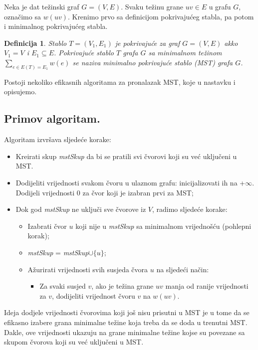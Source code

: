 \documentclass[a4paper, utf8, 11pt, colorlinks]{book}
\newtheorem{definition}{Definicija}
\begin{document}
Neka je dat težinski graf $G=(V,E)$. Svaku težinu grane $uv \in E $ u grafu $G$, označimo sa $w(uv)$. 
Krenimo prvo sa definicijom pokrivajućeg stabla, pa potom i minimalnog pokrivajućeg stabla. 
\begin{definition}
  Stablo $T =(V_1, E_1)$ je pokrivajuće za graf $G=(V,E)$ akko
  $V_1 = V$ i $E_1 \subseteq E$. Pokrivajuće stablo $T$ grafa $G$ sa minimalnom težinom 
  $\sum_{e \in E(T)=E_1} w(e)$ se naziva minimalno pokrivajuće stablo (MST) grafa $G$. 
\end{definition}
Postoji nekoliko efikasnih algoritama za pronalazak MST, koje u nastavku i opisujemo. 


\subsection{Primov algoritam.}

Algoritam izvršava sljedeće korake:

\begin{itemize}
	\item Kreirati skup \emph{mstSkup} da bi se pratili svi čvorovi koji su već uključeni u MST.
	\item Dodijeliti vrijednosti svakom čvoru u ulaznom grafu: inicijalizovati ih na +$\infty$. 
	      Dodijeli vrijednosti 0 za čvor koji je izabran prvi za MST;
	\item Dok god \emph{mstSkup} ne uključi sve čvorove iz $V$, radimo sljedeće korake:
	\begin{itemize}
		\item Izabrati čvor $u$ koji nije u \emph{mstSkup} sa minimalnom vrijednošću (pohlepni korak);
		\item \emph{mstSkup} = \emph{mstSkup}$\cup \{u\}$;
		\item Ažurirati vrijednosti svih susjeda čvora $u$ na sljedeći način:
		     \begin{itemize}
		     	\item Za svaki susjed $v$, ako je težina grane $uv$ manja od
		             ranije vrijednosti za $v$, dodijeliti vrijednost čvoru $v$ na $w(uv)$. 		    
	         \end{itemize}
	\end{itemize}
\end{itemize}

Ideja dodjele vrijednosti čvorovima koji još nisu prisutni u MST je u tome da se efikasno izabere grana minimalne težine koja treba da se doda u trenutni MST. Dakle, ove vrijednosti ukazuju na grane minimalne težine kojse su povezane sa skupom čvorova koji su već uključeni u MST.
\end{document}
